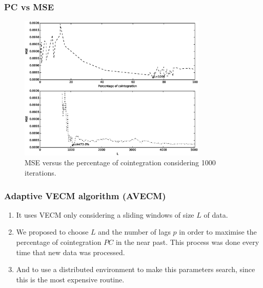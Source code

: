 \documentclass{beamer}
\begin{document}
\begin{frame}
\frametitle{PC vs MSE}
\begin{figure}[ht!]
  \centering
  \includegraphics[width=0.8\textwidth]{img/51_Fig2}
  \caption{MSE versus the percentage of cointegration considering 1000
  iterations. }
  \label{fig:cointvsmse}
\end{figure}
\end{frame}

\begin{frame}
\frametitle{Adaptive VECM algorithm (AVECM)}
\begin{enumerate}
\item It uses VECM only considering a sliding windows of size $L$ of data.
\item We proposed to choose $L$ and the number of lags $p$ in order to maximise the percentage of cointegration $PC$ in the near past. This process was done every time that new data was processed. 
\item And to use a distributed environment to make this parameters search, since this is the most expensive routine.
\end{enumerate}
\end{frame}
\end{document}
